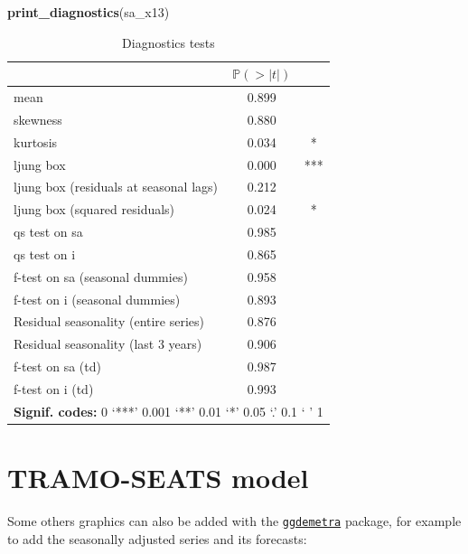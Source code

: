 \documentclass[
]{article}
\newenvironment{Shaded}{\begin{snugshade}}{\end{snugshade}}
\newcommand{\FunctionTok}[1]{\textcolor[rgb]{0.13,0.29,0.53}{\textbf{#1}}}
\newcommand{\NormalTok}[1]{#1}
\begin{document}
\begin{Shaded}
\begin{Highlighting}[]
\FunctionTok{print\_diagnostics}\NormalTok{(sa\_x13)}
\end{Highlighting}
\end{Shaded}

\begin{table}[H]
\centering
\caption{\label{tab:unnamed-chunk-3}Diagnostics tests}
\centering
\begin{tabular}[t]{l|c|c}
\hline
  & $\mathbb P (> \lvert t \rvert)$ & \\
\hline
mean & 0.899 & \\
\hline
skewness & 0.880 & \\
\hline
kurtosis & 0.034 & *\\
\hline
ljung box & 0.000 & ***\\
\hline
ljung box (residuals at seasonal lags) & 0.212 & \\
\hline
ljung box (squared residuals) & 0.024 & *\\
\hline
qs test on sa & 0.985 & \\
\hline
qs test on i & 0.865 & \\
\hline
f-test on sa (seasonal dummies) & 0.958 & \\
\hline
f-test on i (seasonal dummies) & 0.893 & \\
\hline
Residual seasonality (entire series) & 0.876 & \\
\hline
Residual seasonality (last 3 years) & 0.906 & \\
\hline
f-test on sa (td) & 0.987 & \\
\hline
f-test on i (td) & 0.993 & \\
\hline
\multicolumn{3}{l}{\rule{0pt}{1em}\textbf{Signif. codes: }0 `***' 0.001 `**' 0.01 `*' 0.05 `.' 0.1 ` ' 1}\\
\end{tabular}
\end{table}

\section{TRAMO-SEATS model}\label{tramo-seats-model}

Some others graphics can also be added with the
\href{https://aqlt.github.io/ggdemetra/}{\texttt{ggdemetra}} package,
for example to add the seasonally adjusted series and its forecasts:
\end{document}
